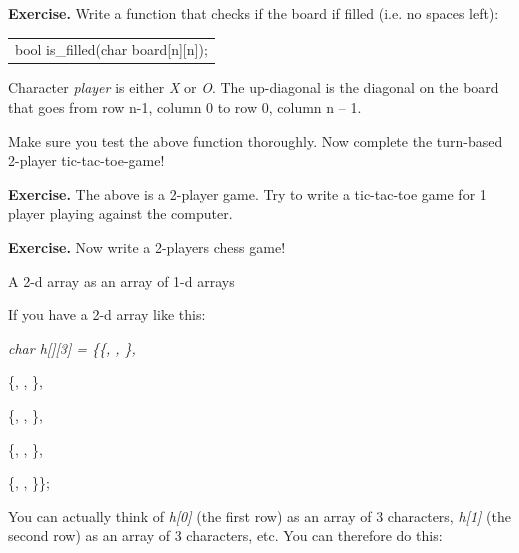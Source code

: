 \textbf{Exercise.} Write a function that checks if the board if filled
(i.e. no spaces left):

\begin{longtable}[]{@{}l@{}}
\toprule\noalign{}
 \\
\midrule\noalign{}
\endhead
\bottomrule\noalign{}
\endlastfoot
bool is\_filled(char board{[}n{]}{[}n{]}); \\
\end{longtable}

Character \emph{player} is either
\emph{\textquotesingle X\textquotesingle{}} or
\emph{\textquotesingle O\textquotesingle{}}. The up-diagonal is the
diagonal on the board that goes from row n-1, column 0 to row 0, column
n -- 1.

Make sure you test the above function thoroughly. Now complete the
turn-based 2-player tic-tac-toe-game!

\textbf{Exercise.} The above is a 2-player game. Try to write a
tic-tac-toe game for 1 player playing against the computer.

\textbf{Exercise.} Now write a 2-players chess game!

A 2-d array as an array of 1-d arrays

If you have a 2-d array like this:

\emph{char h{[}{]}{[}3{]} = \{\{\textquotesingle*\textquotesingle,
\textquotesingle{} \textquotesingle,
\textquotesingle*\textquotesingle\},}

\{\textquotesingle*\textquotesingle, \textquotesingle{}
\textquotesingle, \textquotesingle*\textquotesingle\},

\{\textquotesingle*\textquotesingle, \textquotesingle*\textquotesingle,
\textquotesingle*\textquotesingle\},

\{\textquotesingle*\textquotesingle, \textquotesingle{}
\textquotesingle, \textquotesingle*\textquotesingle\},

\{\textquotesingle*\textquotesingle, \textquotesingle{}
\textquotesingle, \textquotesingle*\textquotesingle\}\};

You can actually think of \emph{h{[}0{]}} (the first row) as an array of
3 characters, \emph{h{[}1{]}} (the second row) as an array of 3
characters, etc. You can therefore do this:


